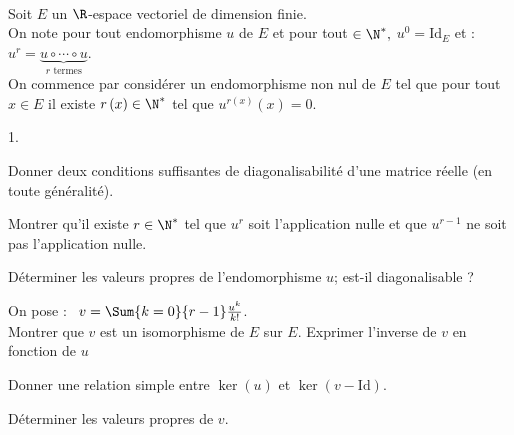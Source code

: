 \documentclass[11pt]{article}%
\begin{document}
\newpage


\begin{exerciceAP}~\\
  Soit $E$ un $\R$-espace vectoriel de dimension finie.\\
  On note pour tout endomorphisme $u$ de $E$ et pour tout $\in
  \N^{\ast },$ $u^{0}= \mathrm{Id}_{E}$ et : \
  $u^{r} = \underset{r\text{ termes}}{\underbrace{u\circ \cdots \circ
      u}}$.\\[.2cm]
  On commence par considérer un endomorphisme non nul de $E$ tel que
  pour tout $x\in E$ il existe $r\left( x\right) \in \N^{\ast }$ tel
  que $u^{r\left( x\right) }(x) = 0$.
  \begin{noliste}{1.}
    \setlength{\itemsep}{2mm}
  \item Donner deux conditions suffisantes de diagonalisabilité d'une
    matrice réelle (en toute généralité).

  \item Montrer qu'il existe $r\in \N^{\ast }$ tel que $u^{r}$ soit
    l'application nulle et que $u^{r-1}$ ne soit pas l'application
    nulle.

  \item Déterminer les valeurs propres de l'endomorphisme $u$; est-il
    diagonalisable ?

  \item On pose : \ $v=\Sum{k=0}{r-1}\frac{u^{k}}{k!}$.\\
    Montrer que $v$ est un isomorphisme de $E$ sur $E$. Exprimer
    l'inverse de $v$ en fonction de $u$

  \item Donner une relation simple entre $\ker \left( u\right) $ et
    $\ker \left( v-\mathrm{Id}\right)$.

  \item Déterminer les valeurs propres de $v$.
  \end{noliste}
\end{exerciceAP}
\end{document}
